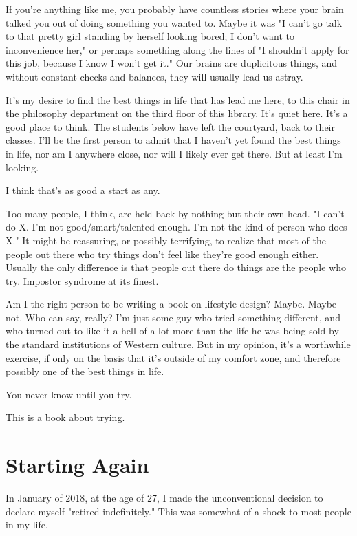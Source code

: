 \documentclass[]{book}
\begin{document}
If you're anything like me, you probably have countless stories where your brain
talked you out of doing something you wanted to. Maybe it was "I can't go talk
to that pretty girl standing by herself looking bored; I don't want to
inconvenience her," or perhaps something along the lines of "I shouldn't apply
for this job, because I know I won't get it." Our brains are duplicitous things,
and without constant checks and balances, they will usually lead us astray.

It's my desire to find the best things in life that has lead me here, to this
chair in the philosophy department on the third floor of this library. It's
quiet here. It's a good place to think. The students below have left the
courtyard, back to their classes. I'll be the first person to admit that I
haven't yet found the best things in life, nor am I anywhere close, nor will I
likely ever get there. But at least I'm looking.

I think that's as good a start as any.

Too many people, I think, are held back by nothing but their own head. "I can't
do X. I'm not good/smart/talented enough. I'm not the kind of person who does
X." It might be reassuring, or possibly terrifying, to realize that most of the
people out there who try things don't feel like they're good enough either.
Usually the only difference is that people out there do things are the people
who try. Impostor syndrome at its finest.

Am I the right person to be writing a book on lifestyle design? Maybe. Maybe
not. Who can say, really? I'm just some guy who tried something different, and
who turned out to like it a hell of a lot more than the life he was being sold
by the standard institutions of Western culture. But in my opinion, it's a
worthwhile exercise, if only on the basis that it's outside of my comfort zone,
and therefore possibly one of the best things in life.

You never know until you try.

This is a book about trying.


\chapter{Starting Again}

In January of 2018, at the age of 27, I made the unconventional decision to
declare myself "retired indefinitely." This was somewhat of a shock to most
people in my life.
\end{document}
